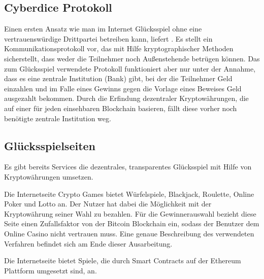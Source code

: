 \subsection{Cyberdice Protokoll}

Einen ersten Ansatz wie man im Internet Glücksspiel ohne eine vertrauenswürdige Drittpartei betreiben kann, liefert \cite{cyberdice_paper}. Es stellt ein Kommunikationsprotokoll vor, das mit Hilfe kryptographischer Methoden sicherstellt, dass weder die Teilnehmer noch Außenstehende betrügen können. Das zum Glücksspiel verwendete Protokoll funktioniert aber nur unter der Annahme, dass es eine zentrale Institution (Bank) gibt, bei der die Teilnehmer Geld einzahlen und im Falle eines Gewinns gegen die Vorlage eines Beweises Geld ausgezahlt bekommen.
\space
Durch die Erfindung dezentraler Kryptowährungen, die auf einer für jeden einsehbaren Blockchain basieren, fällt diese vorher noch benötigte zentrale Institution weg.


\subsection{Glücksspielseiten}


Es gibt bereits Services die dezentrales, transparentes Glücksspiel mit Hilfe von Kryptowährungen umsetzen.

Die Internetseite Crypto Games \cite{crypto_games} bietet Würfelspiele, Blackjack, Roulette, Online Poker und Lotto an. Der Nutzer hat dabei die Möglichkeit mit der Kryptowährung seiner Wahl zu bezahlen. Für die Gewinnerauswahl bezieht diese Seite einen Zufallsfaktor von der Bitcoin Blockchain ein, sodass der Benutzer dem Online Casino nicht vertrauen muss.
Eine genaue Beschreibung des verwendeten Verfahren befindet sich am Ende dieser Ausarbeitung.

Die Internetseite \cite{vdice} bietet Spiele, die durch Smart Contracts auf der Ethereum Plattform umgesetzt sind, an.